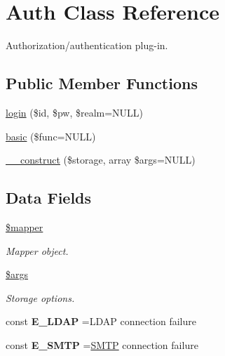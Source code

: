 \hypertarget{class_auth}{}\section{Auth Class Reference}
\label{class_auth}


Authorization/authentication plug-\/in.  


\subsection*{Public Member Functions}
\begin{DoxyCompactItemize}
\item 
\hyperlink{class_auth_a6795c5b38d65b91cd9512fd1aea79577}{login} (\$id, \$pw, \$realm=N\+U\+LL)
\item 
\hyperlink{class_auth_ac76f1632910cb4c297b9244191530458}{basic} (\$func=N\+U\+LL)
\item 
\hyperlink{class_auth_a9ca59d2216de9a1756d9886e527b3971}{\+\_\+\+\_\+construct} (\$storage, array \$args=N\+U\+LL)
\end{DoxyCompactItemize}
\subsection*{Data Fields}
\begin{DoxyCompactItemize}
\item 
\hypertarget{class_auth_ace79db87eaeb4a62b8d0b4323f91ebe6}{}\label{class_auth_ace79db87eaeb4a62b8d0b4323f91ebe6} 
\hyperlink{class_auth_ace79db87eaeb4a62b8d0b4323f91ebe6}{\$mapper}
\begin{DoxyCompactList}\small\item\em Mapper object. \end{DoxyCompactList}\item 
\hypertarget{class_auth_a67e94494731d99ed23b123e95175bc10}{}\label{class_auth_a67e94494731d99ed23b123e95175bc10} 
\hyperlink{class_auth_a67e94494731d99ed23b123e95175bc10}{\$args}
\begin{DoxyCompactList}\small\item\em Storage options. \end{DoxyCompactList}\end{DoxyCompactItemize}
{\bf }\par
\begin{DoxyCompactItemize}
\item 
\hypertarget{class_auth_ab6a2feaefb83bee8bb8d4162543a4178}{}\label{class_auth_ab6a2feaefb83bee8bb8d4162543a4178} 
const {\bfseries E\+\_\+\+L\+D\+AP} =\textquotesingle{}L\+D\+AP connection failure\textquotesingle{}
\item 
\hypertarget{class_auth_a340cd055cd9bc3254658a9cf246313c7}{}\label{class_auth_a340cd055cd9bc3254658a9cf246313c7} 
const {\bfseries E\+\_\+\+S\+M\+TP} =\textquotesingle{}\hyperlink{class_s_m_t_p}{S\+M\+TP} connection failure\textquotesingle{}
\end{DoxyCompactItemize}

